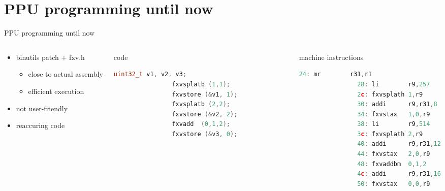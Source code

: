 \documentclass[10pt]{beamer}
\begin{document}
\section{PPU programming until now}
\begin{frame}[fragile]{PPU programming until now}
	\begin{columns}[t]
		\begin{column}{0.35\textwidth}
    		\begin{itemize}
				\item binutils patch + fxv.h
					\begin{itemize}
						\item close to actual assembly
						\item efficient execution
					\end{itemize}
				\item not user-friendly
				\item reaccuring code
			\end{itemize}    
    	\end{column}    
    	\begin{column}{0.25\textwidth}
     		\begin{block}{code}
        		\begin{lstlisting}[language=C++,basicstyle=\ttfamily\scriptsize,keywordstyle=\color{red}]
				uint32_t v1, v2, v3;
				fxvsplatb (1,1);
				fxvstore (&v1, 1);
				fxvsplatb (2,2);
				fxvstore (&v2, 2);
				fxvadd 	(0,1,2);
				fxvstore (&v3, 0);				
				\end{lstlisting}
      		\end{block}
    	\end{column}
    	\begin{column}{0.30\textwidth}
    		\begin{block}{machine instructions}
       			\begin{lstlisting}[language=C++,basicstyle=\ttfamily\scriptsize,keywordstyle=\color{red}]
				24: mr        r31,r1
				28: li        r9,257
				2c: fxvsplath 1,r9
				30: addi      r9,r31,8
				34: fxvstax   1,0,r9
				38: li        r9,514
				3c: fxvsplath 2,r9
				40: addi      r9,r31,12
				44: fxvstax   2,0,r9
				48: fxvaddbm  0,1,2
				4c: addi      r9,r31,16
				50: fxvstax   0,0,r9
			\end{lstlisting}
      		\end{block}
		\end{column}
	\end{columns}
\end{frame}
\end{document}
